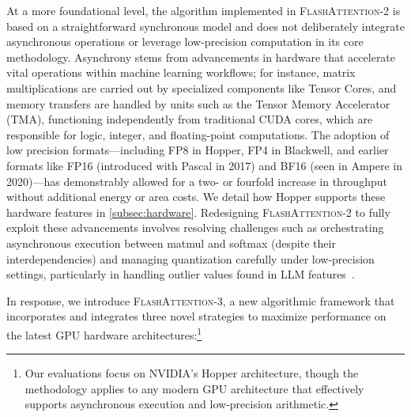 At a more foundational level, the algorithm implemented in \textsc{FlashAttention-2} is based on a straightforward synchronous model and does not deliberately integrate asynchronous operations or leverage low-precision computation in its core methodology. Asynchrony stems from advancements in hardware that accelerate vital operations within machine learning workflows; for instance, matrix multiplications are carried out by specialized components like Tensor Cores, and memory transfers are handled by units such as the Tensor Memory Accelerator (TMA), functioning independently from traditional CUDA cores, which are responsible for logic, integer, and floating-point computations. The adoption of low precision formats—including FP8 in Hopper, FP4 in Blackwell, and earlier formats like FP16 (introduced with Pascal in 2017) and BF16 (seen in Ampere in 2020)—has demonstrably allowed for a two- or fourfold increase in throughput without additional energy or area costs. We detail how Hopper supports these hardware features in \cref{subsec:hardware}. 
Redesigning \textsc{FlashAttention-2} to fully exploit these advancements involves resolving challenges such as orchestrating asynchronous execution between matmul and softmax (despite their interdependencies) and managing quantization carefully under low-precision settings, particularly in handling outlier values found in LLM features~\citep{dettmers2208llm, sun2024massive}.

In response, we introduce \textsc{FlashAttention-3}, a new algorithmic framework that incorporates and integrates three novel strategies to maximize performance on the latest GPU hardware architectures:\footnote{Our evaluations focus on NVIDIA’s Hopper architecture, though the methodology applies to any modern GPU architecture that effectively supports asynchronous execution and low-precision arithmetic.}

